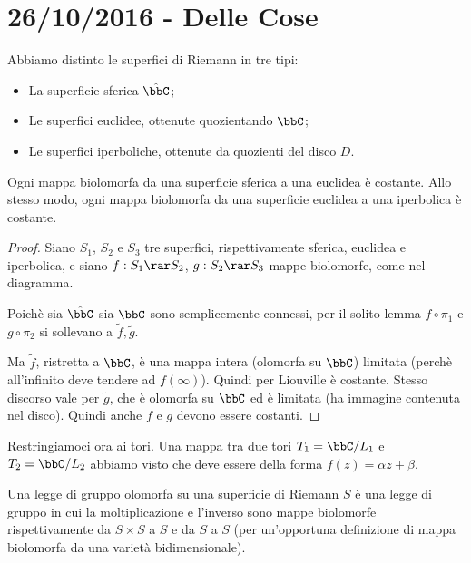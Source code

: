 \chapter{26/10/2016 - Delle Cose}
	Abbiamo distinto le superfici di Riemann in tre tipi:
	\begin{itemize}
	 \item La superficie sferica $\hat\bbC$;
	 \item Le superfici euclidee, ottenute quozientando $\bbC$;
	 \item Le superfici iperboliche, ottenute da quozienti del disco $D$.
	\end{itemize}

	\begin{proposizione}
		Ogni mappa biolomorfa da una superficie sferica a una euclidea è costante. Allo stesso modo, ogni mappa biolomorfa da una superficie euclidea a una iperbolica è costante.
	\end{proposizione}
	
	\begin{proof}
		Siano $S_1$, $S_2$ e $S_3$ tre superfici, rispettivamente sferica, euclidea e iperbolica, e siano $f: S_1 \rar S_2$, $g: S_2 \rar S_3$ mappe biolomorfe, come nel diagramma.
		
		
		Poichè sia $\hat\bbC$ sia $\bbC$ sono semplicemente connessi, per il solito lemma $f \circ \pi_1$ e $g \circ \pi_2$ si sollevano a $\tilde f, \tilde g$. 
		
		Ma $\tilde f$, ristretta a $\bbC$, è una mappa intera (olomorfa su $\bbC$) limitata (perchè all'infinito deve tendere ad $f(\infty)$). Quindi per Liouville è costante.
		Stesso discorso vale per $\tilde g$, che è olomorfa su $\bbC$ ed è limitata (ha immagine contenuta nel disco). Quindi anche $f$ e $g$ devono essere costanti.
		
		
	\end{proof}
	
	Restringiamoci ora ai tori. Una mappa tra due tori $T_1 = \bbC/L_1$ e $T_2 = \bbC/L_2$ abbiamo visto che deve essere della forma $f(z)=\alpha z + \beta$.
	
	\begin{definizione}
		Una legge di gruppo olomorfa su una superficie di Riemann $S$ è una legge di gruppo in cui la moltiplicazione e l'inverso sono mappe biolomorfe rispettivamente da $S \times S$ a $S$ e da $S$ a $S$ (per un'opportuna definizione di mappa biolomorfa da una varietà bidimensionale).
	\end{definizione}
	
